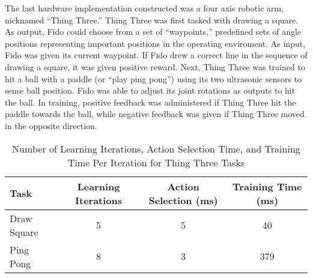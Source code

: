 The last hardware implementation constructed was a four axis robotic arm, nicknamed ``Thing Three.''
Thing Three was first tasked with drawing a square.
As output, Fido could choose from a set of ``waypoints,'' predefined sets of angle positions representing important positions in the operating enviroment.
As input, Fido was given its current waypoint.
If Fido drew a correct line in the sequence of drawing a square, it was given positive reward.
Next, Thing Three was trained to hit a ball with a paddle (or ``play ping pong'') using its two ultrasonic sensors to sense ball position.
Fido was able to adjust its joint rotations as outputs to hit the ball.
In training, positive feedback was administered if Thing Three hit the paddle towards the ball, while negative feedback was given if Thing Three moved in the opposite direction.

\begin{table}[ht]
	\centering
	\begin{tabular}{@{}lccc@{}}
		\toprule
		Task              & Learning Iterations & Action Selection (ms) & Training Time (ms) \\ \midrule
		Draw Square         & 5                   & 5                    & 40                 \\
		Ping Pong          & 8                  & 3                    & 379                \\
		\bottomrule
	\end{tabular}
	\caption {Number of Learning Iterations, Action Selection Time, and Training Time Per Iteration for Thing Three Tasks} \label{tab:thingthreeresults}
\end{table}

